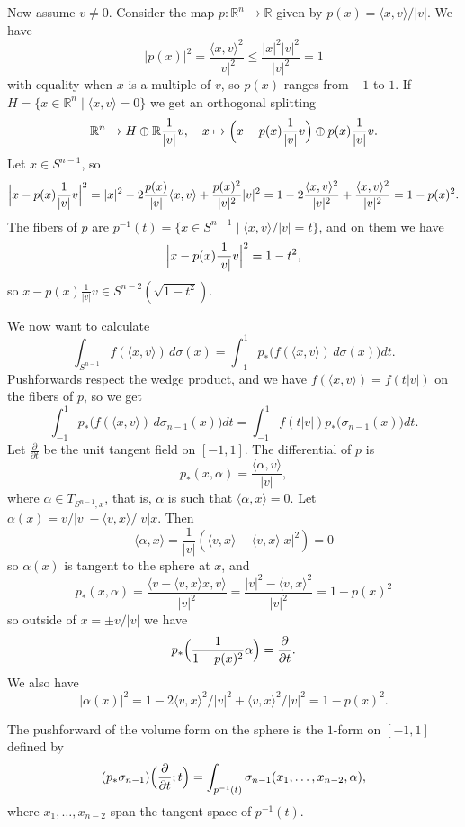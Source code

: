\documentclass[11pt]{article}
\theoremstyle{definition}
\newcommand{\kk}[1]{\mathbb{#1}}
\begin{document}
Now assume $v \not= 0$. Consider the map $p : \kk R^n \to \kk R$ given by $p(x) = \langle x, v \rangle / |v|$.
We have
\[
|p(x)|^2
= \frac{\langle x, v \rangle^2}{|v|^2}
\leq \frac{|x|^2 |v|^2}{|v|^2} = 1
\]
with equality when $x$ is a multiple of $v$, so $p(x)$ ranges from $-1$ to $1$.
If $H = \{ x \in \kk R^n \mid \langle x, v \rangle = 0\}$
we get an orthogonal splitting
\[
\kk R^n \to H \oplus \kk R \frac{1}{|v|}v,
\quad
x \mapsto \Bigl(x - p(x) \frac{1}{|v|} v\Bigr) \oplus p(x) \frac{1}{|v|}v.
\]
Let $x \in S^{n-1}$, so
\[
\Bigl|x - p(x)\frac{1}{|v|}v\Bigr|^2
= |x|^2 - 2 \frac{p(x)}{|v|} \langle x, v \rangle + \frac{p(x)^2}{|v|^2} |v|^2
= 1 - 2 \frac{\langle x, v \rangle^2}{|v|^2} + \frac{\langle x, v \rangle^2}{|v|^2}
= 1 - p(x)^2.
\]
The fibers of $p$ are $p^{-1}(t) = \{ x \in S^{n-1} \mid \langle x, v \rangle/|v| = t \}$, and on them we have
\[
\Bigl|x-p(x)\frac{1}{|v|}v\Bigr|^2
= 1 - t^2,
\]
so $x-p(x)\frac{1}{|v|}v \in S^{n-2}(\sqrt{1-t^2})$.

We now want to calculate
\[
\int_{S^{n-1}} f(\langle x, v \rangle) \, d\sigma(x)
= \int_{-1}^{1} p_*\bigl(f(\langle x, v \rangle) \, d\sigma(x)\bigr) dt.
\]
Pushforwards respect the wedge product, and we have $f(\langle x, v \rangle) = f(t|v|)$ on the fibers of $p$, so we get
\[
\int_{-1}^{1} p_*\bigl(f(\langle x, v \rangle) \, d\sigma_{n-1}(x)\bigr) dt
= \int_{-1}^{1} f(t|v|) p_*\bigl(\sigma_{n-1}(x)\bigr) dt.
\]
Let $\frac{\partial}{\partial t}$ be the unit tangent field on $[-1,1]$. The differential of $p$ is
\[
p_*(x, \alpha) = \frac{\langle \alpha, v \rangle}{|v|},
\]
where $\alpha \in T_{S^{n-1},x}$, that is, $\alpha$ is such that $\langle \alpha, x \rangle = 0$. Let $\alpha(x) = v/|v| - \langle v, x \rangle/|v| x$. Then
\[
\langle \alpha, x \rangle
= \frac{1}{|v|}(\langle v, x \rangle - \langle v, x \rangle |x|^2) = 0
\]
so $\alpha(x)$ is tangent to the sphere at $x$,
and
\[
p_*(x, \alpha)
= \frac{\langle v - \langle v, x \rangle x, v \rangle}{|v|^2}
= \frac{|v|^2 - \langle v, x \rangle^2}{|v|^2}
= 1 - p(x)^2
\]
so outside of $x = \pm v/|v|$ we have
\[
p_* \Bigl( \frac{1}{1-p(x)^2} \alpha \Bigr) = \frac{\partial}{\partial t}.
\]
We also have
\[
|\alpha(x)|^2
= 1 - 2 \langle v, x \rangle^2 / |v|^2 + \langle v, x \rangle^2 / |v|^2
= 1 - p(x)^2.
\]

The pushforward of the volume form on the sphere is the $1$-form on $[-1,1]$ defined by
\[
(p_* \sigma_{n-1})\Bigl( \frac{\partial}{\partial t}; t \Bigr)
= \int_{p^{-1}(t)} \sigma_{n-1}(x_1, \ldots, x_{n-2}, \alpha),
\]
where $x_1,\ldots,x_{n-2}$ span the tangent space of $p^{-1}(t)$.
\end{document}
